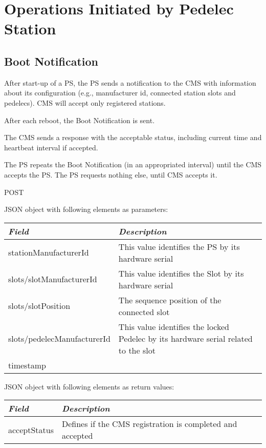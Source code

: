 \section{Operations Initiated by Pedelec Station}

\subsection{Boot Notification}

After start-up of a \acs{PS}, the \acs{PS} sends a notification to the \acs{CMS} with information about its configuration (e.g., manufacturer id, connected station slots and pedelecs). \acs{CMS} will accept only registered stations. 

After each reboot, the Boot Notification is sent.

The \acs{CMS} sends a response with the acceptable status, including current time and heartbeat interval if accepted.

The \acs{PS} repeats the Boot Notification (in an appropriated interval) until the \acs{CMS} accepts the \acs{PS}. The \acs{PS} requests nothing else, until \acs{CMS} accepts it.



 POST

JSON object with following elements as parameters:\\
\begin{tabularx}{\linewidth}{ | l | X | }
  \hline
  \textit{Field} & \textit{Description} \\
  \hline \hline
  stationManufacturerId 		& This value identifies the PS by its hardware serial\\
  slots/slotManufacturerId 	& This value identifies the Slot by its hardware serial \\
  slots/slotPosition			& The sequence position of the connected slot \\
  slots/pedelecManufacturerId & This value identifies the locked Pedelec by its hardware serial related to the slot \\
  timestamp & \\
    \hline
\end{tabularx}

JSON object with following elements as return values:\\
\begin{tabularx}{\linewidth}{ | l | X | }
  \hline
  \textit{Field} & \textit{Description} \\
  \hline \hline
  acceptStatus 		& Defines if the CMS registration is completed and accepted \\
    \hline
\end{tabularx}

